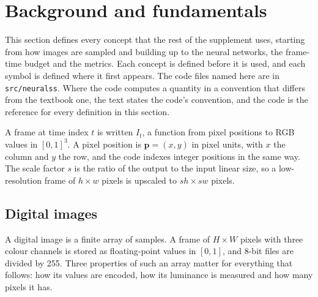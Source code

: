 \section{Background and fundamentals}\label{sec:bg}

This section defines every concept that the rest of the supplement uses, starting from how images are sampled and building up to the neural networks, the frame-time budget and the metrics. Each concept is defined before it is used, and each symbol is defined where it first appears. The code files named here are in \texttt{src/neuralss}. Where the code computes a quantity in a convention that differs from the textbook one, the text states the code's convention, and the code is the reference for every definition in this section.

A frame at time index $t$ is written $I_t$, a function from pixel positions to RGB values in $[0,1]^3$. A pixel position is $\mathbf p=(x,y)$ in pixel units, with $x$ the column and $y$ the row, and the code indexes integer positions in the same way. The scale factor $s$ is the ratio of the output to the input linear size, so a low-resolution frame of $h\times w$ pixels is upscaled to $sh\times sw$ pixels.

\subsection{Digital images}\label{sec:bg-images}

A digital image is a finite array of samples. A frame of $H\times W$ pixels with three colour channels is stored as floating-point values in $[0,1]$, and 8-bit files are divided by 255. Three properties of such an array matter for everything that follows: how its values are encoded, how its luminance is measured and how many pixels it has.

